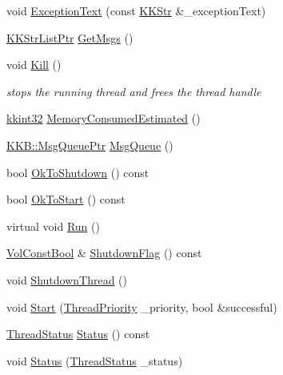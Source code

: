 \begin{DoxyCompactItemize}
void \hyperlink{class_k_k_b_1_1_k_k_thread_a48548f93187fd062a78b4a7410f125a6}{Exception\+Text} (const \hyperlink{class_k_k_b_1_1_k_k_str}{K\+K\+Str} \&\+\_\+exception\+Text)
\item 
\hyperlink{namespace_k_k_b_a8f5f50672f37857425120831223888aa}{K\+K\+Str\+List\+Ptr} \hyperlink{class_k_k_b_1_1_k_k_thread_a7b4f886e76610bb6f585e14d34285f13}{Get\+Msgs} ()
\item 
void \hyperlink{class_k_k_b_1_1_k_k_thread_a66111ed632dffca679c664909d5773bd}{Kill} ()
\begin{DoxyCompactList}\small\item\em stops the running thread and frees the thread handle \end{DoxyCompactList}\item 
\hyperlink{namespace_k_k_b_a8fa4952cc84fda1de4bec1fbdd8d5b1b}{kkint32} \hyperlink{class_k_k_b_1_1_k_k_thread_a0a8d08e9a902c496f7ee0c46f2aee2cc}{Memory\+Consumed\+Estimated} ()
\item 
\hyperlink{namespace_k_k_b_aaa43074273f12ed325a053d9e1faf84a}{K\+K\+B\+::\+Msg\+Queue\+Ptr} \hyperlink{class_k_k_b_1_1_k_k_thread_ac6ca78e4481c0a20b0cf15789d1101c7}{Msg\+Queue} ()
\item 
bool \hyperlink{class_k_k_b_1_1_k_k_thread_a7aa56da8a1a30568b4b7c353909e6b4c}{Ok\+To\+Shutdown} () const 
\item 
bool \hyperlink{class_k_k_b_1_1_k_k_thread_afc63e1d57bfa5a690c13db687b655f32}{Ok\+To\+Start} () const 
\item 
virtual void \hyperlink{class_k_k_b_1_1_k_k_thread_a4ecfa3856e1b5bb4a5a125fdc05c4e67}{Run} ()
\item 
\hyperlink{namespace_k_k_b_a7d390f568e2831fb76b86b56c87bf92f}{Vol\+Const\+Bool} \& \hyperlink{class_k_k_b_1_1_k_k_thread_a271dba95d3432cf7ea4992951f2b2a38}{Shutdown\+Flag} () const 
\item 
void \hyperlink{class_k_k_b_1_1_k_k_thread_af3d38a6013474f4710c1797fbf26d3cb}{Shutdown\+Thread} ()
\item 
void \hyperlink{class_k_k_b_1_1_k_k_thread_aa0dcedfb40c5208fb5764e13851a7728}{Start} (\hyperlink{class_k_k_b_1_1_k_k_thread_ad9b55cc20284bcadd051a20945325e0c}{Thread\+Priority} \+\_\+priority, bool \&successful)
\item 
\hyperlink{class_k_k_b_1_1_k_k_thread_a3f72bb1988ae5dd353b39260ae0acc72}{Thread\+Status} \hyperlink{class_k_k_b_1_1_k_k_thread_a8b6636f59306caf89c24d9f756293d71}{Status} () const 
\item 
void \hyperlink{class_k_k_b_1_1_k_k_thread_a90737d98d41227c3748e0404aa69b939}{Status} (\hyperlink{class_k_k_b_1_1_k_k_thread_a3f72bb1988ae5dd353b39260ae0acc72}{Thread\+Status} \+\_\+status)

\end{DoxyCompactItemize}
